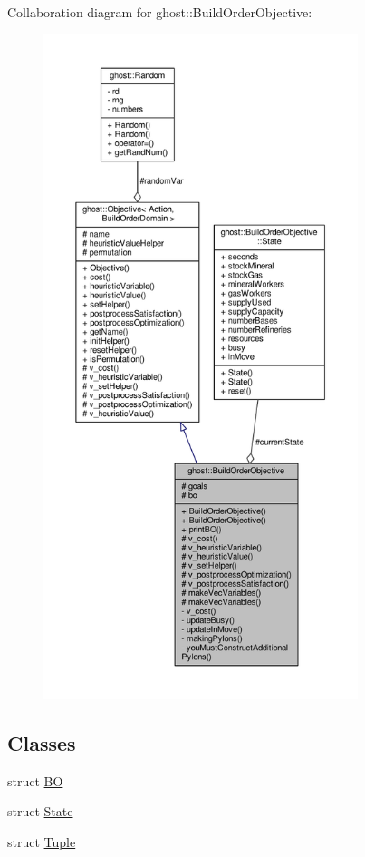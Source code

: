 Collaboration diagram for ghost\-:\-:Build\-Order\-Objective\-:
\nopagebreak
\begin{figure}[H]
\begin{center}
\leavevmode
\includegraphics[height=550pt]{classghost_1_1BuildOrderObjective__coll__graph}
\end{center}
\end{figure}
\subsection*{Classes}
\begin{DoxyCompactItemize}
\item 
struct \hyperlink{structghost_1_1BuildOrderObjective_1_1BO}{B\-O}
\item 
struct \hyperlink{structghost_1_1BuildOrderObjective_1_1State}{State}
\item 
struct \hyperlink{structghost_1_1BuildOrderObjective_1_1Tuple}{Tuple}
\end{DoxyCompactItemize}
